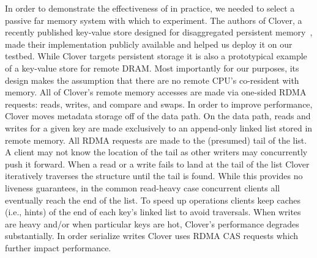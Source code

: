 In order to demonstrate the effectiveness of {\sword} in practice, we
needed to select a passive far memory system with which to experiment.
The authors of Clover, a recently published key-value store designed
for disaggregated persistent memory~\cite{clover}, made their
implementation publicly available and helped us deploy it on our
testbed. While Clover targets persistent storage it is also a
prototypical example of a key-value store for remote DRAM.  Most
importantly for our purposes, its design makes the assumption that
there are no remote CPU's co-resident with memory. All of Clover's
remote memory accesses are made via one-sided RDMA requests: reads,
writes, and compare and swaps.  In order to improve performance,
Clover moves metadata storage off of the data path. On the data path,
reads and writes for a given key are made exclusively to an
append-only linked list stored in remote memory. All RDMA requests are
made to the (presumed) tail of the list. A client may not know the
location of the tail as other writers may concurrently push it
forward.  When a read or a write fails to land at the tail of the list
Clover iteratively traverses the structure until the tail is
found. While this provides no liveness guarantees, in the common
read-heavy case concurrent clients all eventually reach the end of the
list. To speed up operations clients keep caches (i.e., hints) of the
end of each key's linked list to avoid traversals. When writes are
heavy and/or when particular keys are hot, Clover's performance
degrades substantially. In order serialize writes Clover uses RDMA CAS
requests which further impact performance.

